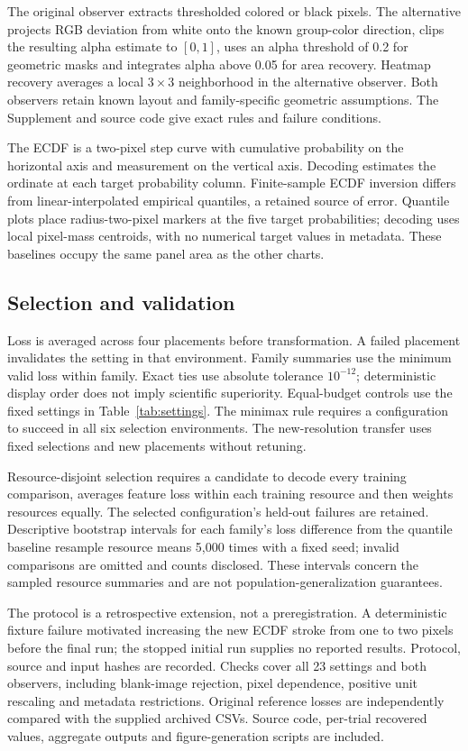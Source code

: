 \documentclass[11pt]{article}
\begin{document}
The original observer extracts thresholded colored or black pixels. The alternative projects RGB deviation from white onto the known group-color direction, clips the resulting alpha estimate to $[0,1]$, uses an alpha threshold of 0.2 for geometric masks and integrates alpha above 0.05 for area recovery. Heatmap recovery averages a local $3\times3$ neighborhood in the alternative observer. Both observers retain known layout and family-specific geometric assumptions. The Supplement and source code give exact rules and failure conditions.

The ECDF is a two-pixel step curve with cumulative probability on the horizontal axis and measurement on the vertical axis. Decoding estimates the ordinate at each target probability column. Finite-sample ECDF inversion differs from linear-interpolated empirical quantiles, a retained source of error. Quantile plots place radius-two-pixel markers at the five target probabilities; decoding uses local pixel-mass centroids, with no numerical target values in metadata. These baselines occupy the same panel area as the other charts.

\subsection*{Selection and validation}
Loss is averaged across four placements before transformation. A failed placement invalidates the setting in that environment. Family summaries use the minimum valid loss within family. Exact ties use absolute tolerance $10^{-12}$; deterministic display order does not imply scientific superiority. Equal-budget controls use the fixed settings in Table~\ref{tab:settings}. The minimax rule requires a configuration to succeed in all six selection environments. The new-resolution transfer uses fixed selections and new placements without retuning.

Resource-disjoint selection requires a candidate to decode every training comparison, averages feature loss within each training resource and then weights resources equally. The selected configuration's held-out failures are retained. Descriptive bootstrap intervals for each family's loss difference from the quantile baseline resample resource means 5,000 times with a fixed seed; invalid comparisons are omitted and counts disclosed. These intervals concern the sampled resource summaries and are not population-generalization guarantees.

The protocol is a retrospective extension, not a preregistration. A deterministic fixture failure motivated increasing the new ECDF stroke from one to two pixels before the final run; the stopped initial run supplies no reported results. Protocol, source and input hashes are recorded. Checks cover all 23 settings and both observers, including blank-image rejection, pixel dependence, positive unit rescaling and metadata restrictions. Original reference losses are independently compared with the supplied archived CSVs. Source code, per-trial recovered values, aggregate outputs and figure-generation scripts are included.
\end{document}
